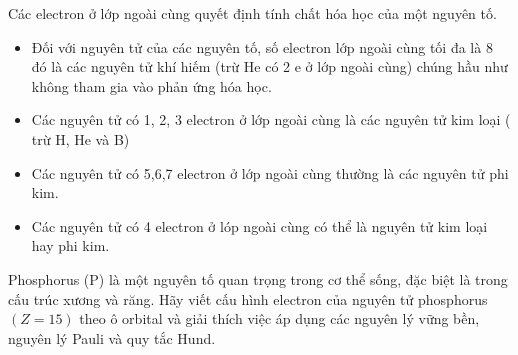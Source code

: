 \begin{pp}
	Các electron ở lớp ngoài cùng quyết định tính chất hóa học của một nguyên tố.
	\begin{itemize}
		\item Đối với nguyên tử của các nguyên tố, số electron lớp ngoài cùng tối đa là 8 đó là các nguyên tử khí hiếm (trừ He có 2 e ở lớp ngoài cùng) chúng hầu như không tham gia vào phản ứng hóa học.
		\item Các nguyên tử có 1, 2, 3 electron ở lớp ngoài cùng là các nguyên tử kim loại ( trừ H, He và B)
		\item Các nguyên tử có 5,6,7 electron ở lớp ngoài cùng thường là các nguyên tử phi kim.
		\item Các nguyên tử có 4 electron  ở lóp ngoài cùng  có thể là nguyên tử kim loại hay phi kim.
	\end{itemize}
\end{pp}
\begin{vdex}
	Phosphorus (P) là một nguyên tố quan trọng trong cơ thể sống, đặc biệt là trong cấu trúc xương và răng. Hãy viết cấu hình electron của nguyên tử phosphorus $(Z=15)$ theo ô orbital và giải thích việc áp dụng các nguyên lý vững bền, nguyên lý Pauli và quy tắc Hund.
\end{vdex}

